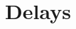 \documentclass[root.tex]{subfiles}
\begin{document}
	
	{\pagestyle{empty}}
	\section{Delays}
	\label{chap:Delays}
	
\end{document}
